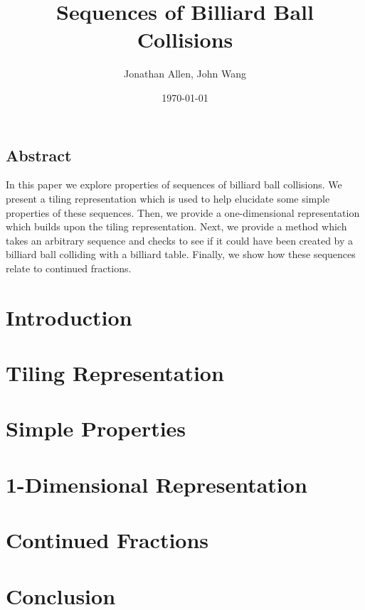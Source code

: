 \documentclass[12pt]{amsart}   %
\begin{document}
\graphicspath{ {figures/} }

\title[Billiards]{Sequences of Billiard Ball Collisions}

\author{Jonathan Allen, John Wang}
\date{\today}

\maketitle

\subsection*{Abstract}

In this paper we explore properties of sequences of billiard ball collisions. We present a tiling representation which is used to help elucidate some simple properties of these sequences. Then, we provide a one-dimensional representation which builds upon the tiling representation. Next, we provide a method which takes an arbitrary sequence and checks to see if it could have been created by a billiard ball colliding with a billiard table. Finally, we show how these sequences relate to continued fractions.

\section{Introduction}


\section{Tiling Representation}


\section{Simple Properties}


\section{1-Dimensional Representation}


\section{Continued Fractions}


\section{Conclusion}


\begin{appendix}
\end{appendix}
\end{document}
